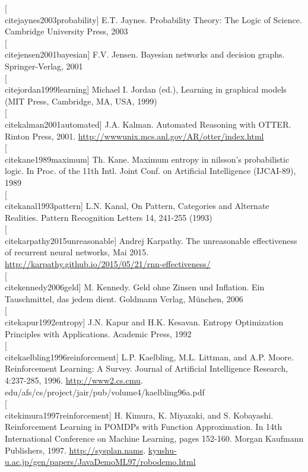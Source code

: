\documentclass[10pt]{book}
\begin{document}
[\\cite{jaynes2003probability}] E.T. Jaynes. Probability Theory: The Logic of Science. Cambridge University Press, 2003\\[0pt]
[\\cite{jensen2001bayesian}] F.V. Jensen. Bayesian networks and decision graphs. Springer-Verlag, 2001\\[0pt]
[\\cite{jordan1999learning}] Michael I. Jordan (ed.), Learning in graphical models (MIT Press, Cambridge, MA, USA, 1999)\\[0pt]
[\\cite{kalman2001automated}] J.A. Kalman. Automated Reasoning with OTTER. Rinton Press, 2001. \href{http://wwwunix.mcs.anl.gov/AR/otter/index.html}{http://wwwunix.mcs.anl.gov/AR/otter/index.html}\\[0pt]
[\\cite{kane1989maximum}] Th. Kane. Maximum entropy in nilsson's probabilistic logic. In Proc. of the 11th Intl. Joint Conf. on Artificial Intelligence (IJCAI-89), 1989\\[0pt]
[\\cite{kanal1993pattern}] L.N. Kanal, On Pattern, Categories and Alternate Realities. Pattern Recognition Letters 14, 241-255 (1993)\\[0pt]
[\\cite{karpathy2015unreasonable}] Andrej Karpathy. The unreasonable effectiveness of recurrent neural networks, Mai 2015. \href{http://karpathy.github.io/2015/05/21/rnn-effectiveness/}{http://karpathy.github.io/2015/05/21/rnn-effectiveness/}\\[0pt]
[\\cite{kennedy2006geld}] M. Kennedy. Geld ohne Zinsen und Inflation. Ein Tauschmittel, das jedem dient. Goldmann Verlag, München, 2006\\[0pt]
[\\cite{kapur1992entropy}] J.N. Kapur and H.K. Kesavan. Entropy Optimization Principles with Applications. Academic Press, 1992\\[0pt]
[\\cite{kaelbling1996reinforcement}] L.P. Kaelbling, M.L. Littman, and A.P. Moore. Reinforcement Learning: A Survey. Journal of Artificial Intelligence Research, 4:237-285, 1996. \href{http://www2.cs.cmu}{http://www2.cs.cmu}. edu/afs/cs/project/jair/pub/volume4/kaelbling96a.pdf\\[0pt]
[\\cite{kimura1997reinforcement}] H. Kimura, K. Miyazaki, and S. Kobayashi. Reinforcement Learning in POMDPs with Function Approximation. In 14th International Conference on Machine Learning, pages 152-160. Morgan Kaufmann Publishers, 1997. \href{http://sysplan.nams}{http://sysplan.nams}. \href{http://kyushu-u.ac.jp/gen/papers/JavaDemoML97/robodemo.html}{kyushu-u.ac.jp/gen/papers/JavaDemoML97/robodemo.html}\\[0pt]
\end{document}
